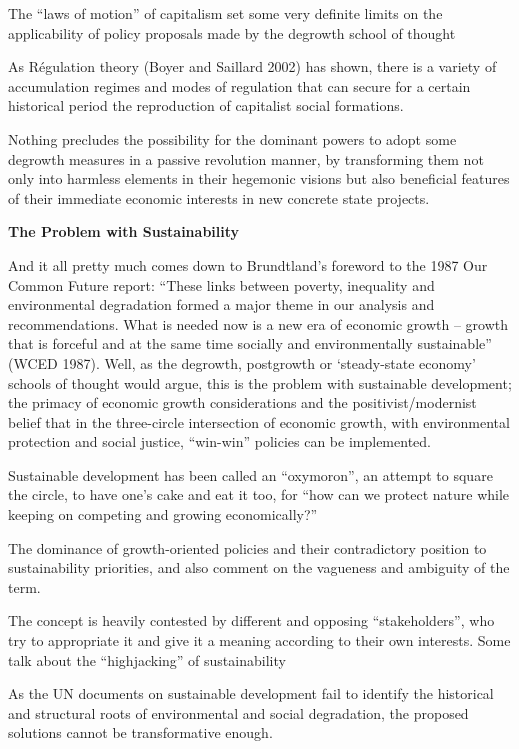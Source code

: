 \documentclass[
]{book}
\begin{document}
The ``laws of motion'' of capitalism set some very definite limits on the applicability of
policy proposals made by the degrowth school of thought

As Régulation theory (Boyer and Saillard 2002) has shown, there is a variety of accumulation
regimes and modes of regulation that can secure for a certain historical period the reproduction of capitalist social formations.

Nothing precludes the possibility for the dominant powers to adopt some degrowth
measures in a passive revolution manner, by transforming them not only into
harmless elements in their hegemonic visions but also beneficial features
of their immediate economic interests in new concrete state projects.

\textbf{The Problem with Sustainability}

And it all pretty much comes down to Brundtland's
foreword to the 1987 Our Common Future report: ``These links between poverty, inequality and environmental
degradation formed a major theme in our analysis and recommendations. What is needed now is a new era of
economic growth -- growth that is forceful and at the same time socially and environmentally sustainable''
(WCED 1987).
Well, as the degrowth, postgrowth or `steady-state economy' schools of thought would argue, this is the
problem with sustainable development; the primacy of economic growth considerations and the
positivist/modernist belief that in the three-circle intersection of economic growth, with environmental
protection and social justice, ``win-win'' policies can be implemented.

Sustainable development has been called
an ``oxymoron'', an attempt to square the circle, to have one's cake and eat it too, for ``how can we protect nature
while keeping on competing and growing economically?''

The dominance
of growth-oriented policies and their contradictory position to sustainability priorities, and also comment on
the vagueness and ambiguity of the term.

The concept is heavily
contested by different and opposing ``stakeholders'', who try to appropriate it and give it a meaning according
to their own interests. Some talk about the ``highjacking'' of sustainability

As the UN documents on sustainable development
fail to identify the historical and structural roots of environmental and social degradation, the proposed solutions
cannot be transformative enough.
\end{document}
